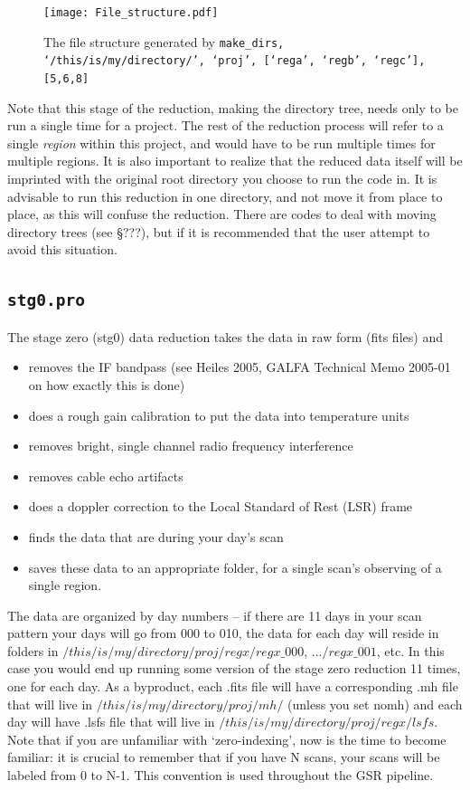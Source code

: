 \documentclass[11pt]{article}
\begin{document}
\begin{center} 
\begin{figure}[htbp]
	    \texttt{[image: File\_structure.pdf]}
        \caption{The file structure generated by \texttt{make\_dirs, `/this/is/my/directory/', `proj', [`rega', `regb', `regc'], [5,6,8]}}
        \label{fs}
\end{figure}
\end{center}
Note that this stage of the reduction, making the directory tree, needs only to be run a single time for a project. The rest of the reduction process will refer to a single {\it region} within this project, and would have to be run multiple times for multiple regions. It is also important to realize that the reduced data itself will be imprinted with the original root directory you choose to run the code in. It is advisable to run this reduction in one directory, and not move it from place to place, as this will confuse the reduction. There are codes to deal with moving directory trees (see \S ???), but if it is recommended that the user attempt to avoid this situation.

\subsection{ \texttt{stg0.pro}}
The stage zero (stg0) data reduction takes the data in raw form (fits files) and
\begin{itemize}
\item removes the IF bandpass (see Heiles 2005, GALFA Technical Memo 2005-01 on how exactly this is done)
\item does a rough gain calibration to put the data into temperature units
\item removes bright, single channel radio frequency interference
\item removes cable echo artifacts
\item does a doppler correction to the Local Standard of Rest (LSR) frame
\item finds the data that are during your day's scan
\item saves these data to an appropriate folder, for a single scan's observing of a single region.
\end{itemize}
  The data are organized by day numbers -- if there are 11 days in your scan pattern your days will go from 000 to 010, the data for each day will reside in folders in $/this/is/my/directory/proj/regx/regx\_000$, $.../regx\_001$, etc. In this case you would end up running some version of the stage zero reduction 11 times, one for each day. As a byproduct, each .fits file will have a  corresponding .mh file that will live in $/this/is/my/directory/proj/mh/$ (unless you set nomh) and each day will have .lsfs file that will live in $/this/is/my/directory/proj/regx/lsfs$. Note that if you are unfamiliar with `zero-indexing', now is the time to become familiar: it is crucial to remember that if you have N scans, your scans will be labeled from 0 to N-1. This convention is used throughout the GSR pipeline.
\end{document}
